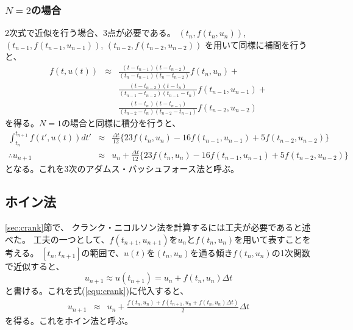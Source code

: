 \documentclass[a4j, titlepage]{jsarticle}
\numberwithin{equation}{section}
\begin{document}
        \subsubsection{$N=2$の場合}
            2次式で近似を行う場合、3点が必要である。
            $(t_n, f(t_n, u_n))$,
            $(t_{n-1}, f(t_{n-1}, u_{n-1}))$,
            $(t_{n-2}, f(t_{n-2}, u_{n-2}))$
            を用いて同様に補間を行うと、
            \begin{eqnarray*}
                f(t, u(t)) &\approx& \frac{(t - t_{n-1})(t - t_{n-2})}{(t_n - t_{n-1})(t_n - t_{n-2})}f(t_n, u_n) + \\
                && \frac{(t - t_{n-2})(t - t_n)}{(t_{n-1} - t_{n-2})(t_{n-1} - t_n)}f(t_{n-1}, u_{n-1}) + \\
                && \frac{(t - t_n)(t - t_{n-1})}{(t_{n-2} - t_n)(t_{n-2} - t_{n-1})}f(t_{n-2}, u_{n-2})
            \end{eqnarray*}
            を得る。$N=1$の場合と同様に積分を行うと、
            \begin{eqnarray}
                \int^{t_{n+1}}_{t_n} f(t', u(t)) dt' &\approx& \frac{\Delta t}{12} \{23f(t_n, u_n) - 16f(t_{n-1}, u_{n-1}) + 5f(t_{n-2}, u_{n-2})\} \nonumber \\
                \therefore u_{n+1} &\approx& u_n + \frac{\Delta t}{12} \{23f(t_n, u_n) - 16f(t_{n-1}, u_{n-1}) + 5f(t_{n-2}, u_{n-2})\}
            \end{eqnarray}
            となる。これを3次のアダムス・バッシュフォース法と呼ぶ。

    \subsection{ホイン法}
        \ref{sec:crank}節で、
        クランク・ニコルソン法を計算するには工夫が必要であると述べた。
        工夫の一つとして、$f(t_{n+1},u_{n+1})$を$u_n$と$f(t_n, u_n)$を用いて表すことを考える。
        $[t_n, t_{n+1}]$の範囲で、$u(t)$を$(t_n, u_n)$を通る傾き$f(t_n, u_n)$の1次関数
        で近似すると、
        \begin{equation*}
            u_{n+1} \approx u(t_{n+1}) = u_n + f(t_n, u_n)\Delta t
        \end{equation*}
        と書ける。これを式(\ref{equ:crank})に代入すると、
        \begin{eqnarray}
            u_{n+1} &\approx& u_n + \frac{f(t_n, u_n) + f(t_{n+1}, u_n + f(t_n, u_n)\Delta t)}{2}\Delta t
        \end{eqnarray}
        を得る。これをホイン法と呼ぶ。
\end{document}
